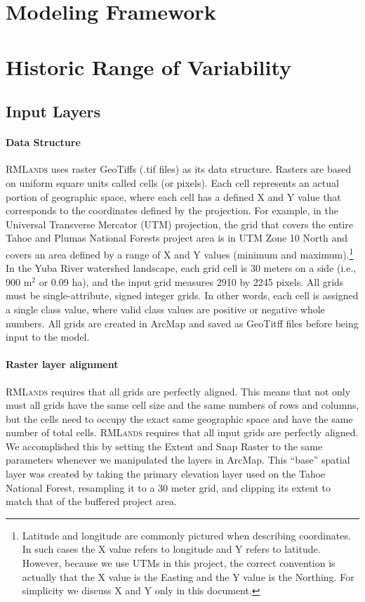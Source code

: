 \section{Modeling Framework}
\label{sec:modelframe}

\section{Historic Range of Variability}

\subsection{Input Layers}
\label{subsec:hrvinputlayers}

\paragraph{Data Structure} \textsc{RMLands} uses raster GeoTiffs (.tif files) as its data structure. Rasters are based on uniform square units called cells (or pixels). Each cell represents an actual portion of geographic space, where each cell has a defined X and Y value that corresponds to the coordinates defined by the projection. For example, in the Universal Transverse Mercator (UTM) projection, the grid that covers the entire Tahoe and Plumas National Forests project area is in UTM Zone 10 North and covers an area defined by a range of X and Y values (minimum and maximum).\footnote{Latitude and longitude are commonly pictured when describing coordinates. In such cases the X value refers to longitude and Y refers to latitude. However, because we use UTMs in this project, the correct convention is actually that the X value is the Easting and the Y value is the Northing. For simplicity we discuss X and Y only in this document.} In the Yuba River watershed landscape, each grid cell is 30 meters on a side (i.e., 900 m$^2$ or 0.09 ha), and the input grid measures 2910 by 2245 pixels. All grids must be single-attribute, signed integer grids. In other words, each cell is assigned a single class value, where valid class values are positive or negative whole numbers. All grids are created in ArcMap and saved as GeoTitff files before being input to the model. 

\paragraph{Raster layer alignment} \textsc{RMLands} requires that all grids are perfectly aligned. This means that not only must all grids have the same cell size and the same numbers of rows and columns, but the cells need to occupy the exact same geographic space and have the same number of total cells. \textsc{RMLands} requires that all input grids are perfectly aligned. We accomplished this by setting the Extent and Snap Raster to the same parameters whenever we manipulated the layers in ArcMap. This ``base'' spatial layer was created by taking the primary elevation layer used on the Tahoe National Forest, resampling it to a 30 meter grid, and clipping its extent to match that of the buffered project area.

